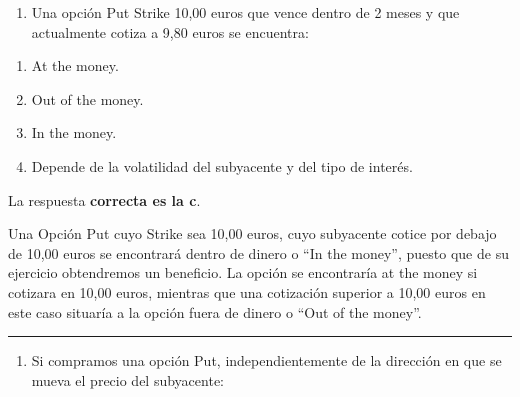 \documentclass[
  letterpaper,
  DIV=11,
  numbers=noendperiod]{scrreprt}
\providecommand{\tightlist}{%
  \setlength{\itemsep}{0pt}\setlength{\parskip}{0pt}}\usepackage{longtable,booktabs,array}
\begin{document}
\begin{enumerate}
\def\labelenumi{\arabic{enumi}.}
\setcounter{enumi}{8}
\tightlist
\item
  Una opción Put Strike 10,00 euros que vence dentro de 2 meses y que
  actualmente cotiza a 9,80 euros se encuentra:
\end{enumerate}

\begin{enumerate}
\def\labelenumi{\alph{enumi})}
\item
  At the money.
\item
  Out of the money.
\item
  In the money.
\item
  Depende de la volatilidad del subyacente y del tipo de interés.
\end{enumerate}

\begin{tcolorbox}[enhanced jigsaw, left=2mm, opacityback=0, colback=white, breakable, arc=.35mm, bottomrule=.15mm, rightrule=.15mm, toprule=.15mm, leftrule=.75mm, colframe=quarto-callout-tip-color-frame]
\begin{minipage}[t]{5.5mm}
\textcolor{quarto-callout-tip-color}{\faLightbulb}
\end{minipage}%
\begin{minipage}[t]{\textwidth - 5.5mm}

La respuesta \textbf{correcta es la c}.

Una Opción Put cuyo Strike sea 10,00 euros, cuyo subyacente cotice por
debajo de 10,00 euros se encontrará dentro de dinero o ``In the money'',
puesto que de su ejercicio obtendremos un beneficio. La opción se
encontraría at the money si cotizara en 10,00 euros, mientras que una
cotización superior a 10,00 euros en este caso situaría a la opción
fuera de dinero o ``Out of the money''.

\end{minipage}%
\end{tcolorbox}

\begin{center}\rule{0.5\linewidth}{0.5pt}\end{center}

\begin{enumerate}
\def\labelenumi{\arabic{enumi}.}
\setcounter{enumi}{9}
\tightlist
\item
  Si compramos una opción Put, independientemente de la dirección en que
  se mueva el precio del subyacente:
\end{enumerate}
\end{document}
